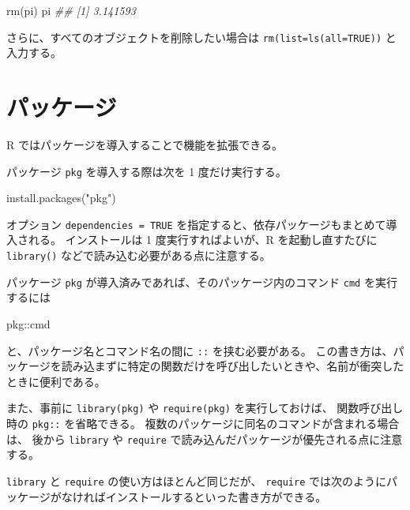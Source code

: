 \documentclass[
  letterpaper,
  xelatex,
  ja=standard, xelatex]{bxjsbook}
\newenvironment{Shaded}{\begin{snugshade}}{\end{snugshade}}
\newcommand{\DocumentationTok}[1]{\textcolor[rgb]{0.37,0.37,0.37}{\textit{#1}}}
\newcommand{\FunctionTok}[1]{\textcolor[rgb]{0.28,0.35,0.67}{#1}}
\newcommand{\NormalTok}[1]{\textcolor[rgb]{0.00,0.23,0.31}{#1}}
\newcommand{\SpecialCharTok}[1]{\textcolor[rgb]{0.37,0.37,0.37}{#1}}
\newcommand{\StringTok}[1]{\textcolor[rgb]{0.13,0.47,0.30}{#1}}
\begin{document}
\begin{Shaded}
\begin{Highlighting}[]
\FunctionTok{rm}\NormalTok{(pi)}
\NormalTok{pi}
\DocumentationTok{\#\# [1] 3.141593}
\end{Highlighting}
\end{Shaded}

さらに、すべてのオブジェクトを削除したい場合は
\texttt{rm(list=ls(all=TRUE))} と入力する。

\section{パッケージ}\label{ux30d1ux30c3ux30b1ux30fcux30b8}

R ではパッケージを導入することで機能を拡張できる。

パッケージ \texttt{pkg} を導入する際は次を 1 度だけ実行する。

\begin{Shaded}
\begin{Highlighting}[]
\FunctionTok{install.packages}\NormalTok{(}\StringTok{"pkg"}\NormalTok{)}
\end{Highlighting}
\end{Shaded}

オプション \texttt{dependencies\ =\ TRUE}
を指定すると、依存パッケージもまとめて導入される。 インストールは 1
度実行すればよいが、R を起動し直すたびに \texttt{library()}
などで読み込む必要がある点に注意する。

パッケージ \texttt{pkg} が導入済みであれば、そのパッケージ内のコマンド
\texttt{cmd} を実行するには

\begin{Shaded}
\begin{Highlighting}[]
\NormalTok{pkg}\SpecialCharTok{::}\NormalTok{cmd}
\end{Highlighting}
\end{Shaded}

と、パッケージ名とコマンド名の間に \texttt{::} を挟む必要がある。
この書き方は、パッケージを読み込まずに特定の関数だけを呼び出したいときや、名前が衝突したときに便利である。

また、事前に \texttt{library(pkg)} や \texttt{require(pkg)}
を実行しておけば、 関数呼び出し時の \texttt{pkg::} を省略できる。
複数のパッケージに同名のコマンドが含まれる場合は、 後から
\texttt{library} や \texttt{require}
で読み込んだパッケージが優先される点に注意する。

\texttt{library} と \texttt{require} の使い方はほとんど同じだが、
\texttt{require}
では次のようにパッケージがなければインストールするといった書き方ができる。
\end{document}
